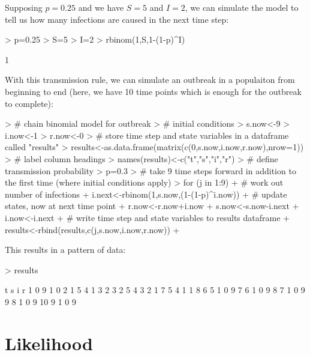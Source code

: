 \documentclass{article}
\begin{document}
Supposing $p=0.25$ and we have $S=5$ and $I=2$, we can simulate the model to tell us how many infections are caused in the next time step:

\begin{Schunk}
\begin{Sinput}
> p=0.25
> S=5
> I=2
> rbinom(1,S,1-(1-p)^I)
\end{Sinput}
\begin{Soutput}
[1] 1
\end{Soutput}
\end{Schunk}

With this transmission rule, we can simulate an outbreak in a populaiton from beginning to end (here, we have 10 time points which is enough for the outbreak to complete):


\begin{Schunk}
\begin{Sinput}
> # chain binomial model for outbreak
> # initial conditions
> s.now<-9
> i.now<-1
> r.now<-0
> # store time step and state variables in a dataframe called "results"
> results<-as.data.frame(matrix(c(0,s.now,i.now,r.now),nrow=1))
> # label column headings 
> names(results)<-c("t","s","i","r")
> # define transmission probability
> p=0.3
> # take 9 time steps forward in addition to the first time (where initial conditions apply)
> for (j in 1:9){ 
+ # work out number of infections
+ i.next<-rbinom(1,s.now,(1-(1-p)^i.now))
+ # update states, now at next time point
+ r.now<-r.now+i.now
+ s.now<-s.now-i.next
+ i.now<-i.next
+ # write time step and state variables to results dataframe
+ results<-rbind(results,c(j,s.now,i.now,r.now))  
+ }
\end{Sinput}
\end{Schunk}

This results in a pattern of data:

\begin{Schunk}
\begin{Sinput}
> results
\end{Sinput}
\begin{Soutput}
   t s i r
1  0 9 1 0
2  1 5 4 1
3  2 3 2 5
4  3 2 1 7
5  4 1 1 8
6  5 1 0 9
7  6 1 0 9
8  7 1 0 9
9  8 1 0 9
10 9 1 0 9
\end{Soutput}
\end{Schunk}

\section*{Likelihood}
\end{document}

